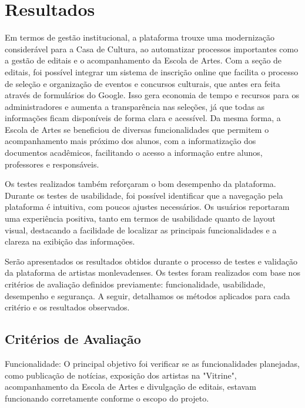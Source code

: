 \chapter{Resultados}
\label{cap:resultados}

Em termos de gestão institucional, a plataforma trouxe uma modernização considerável para a Casa de Cultura, ao automatizar processos importantes como a gestão de editais e o acompanhamento da Escola de Artes. Com a seção de editais, foi possível integrar um sistema de inscrição online que facilita o processo de seleção e organização de eventos e concursos culturais, que antes era feita através de formulários do Google. Isso gera economia de tempo e recursos para os administradores e aumenta a transparência nas seleções, já que todas as informações ficam disponíveis de forma clara e acessível. Da mesma forma, a Escola de Artes se beneficiou de diversas funcionalidades que permitem o acompanhamento mais próximo dos alunos, com a informatização dos documentos acadêmicos, facilitando o acesso a informação entre alunos, professores e responsáveis.

Os testes realizados também reforçaram o bom desempenho da plataforma. Durante os testes de usabilidade, foi possível identificar que a navegação pela plataforma é intuitiva, com poucos ajustes necessários. Os usuários reportaram uma experiência positiva, tanto em termos de usabilidade quanto de layout visual, destacando a facilidade de localizar as principais funcionalidades e a clareza na exibição das informações.

Serão apresentados os resultados obtidos durante o processo de testes e validação da plataforma de artistas monlevadenses. Os testes foram realizados com base nos critérios de avaliação definidos previamente: funcionalidade, usabilidade, desempenho e segurança. A seguir, detalhamos os métodos aplicados para cada critério e os resultados observados.

\section{Critérios de Avaliação}

Funcionalidade: O principal objetivo foi verificar se as funcionalidades planejadas, como publicação de notícias, exposição dos artistas na "Vitrine", acompanhamento da Escola de Artes e divulgação de editais, estavam funcionando corretamente conforme o escopo do projeto.

